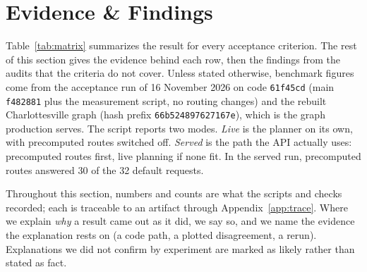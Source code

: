 \section{Evidence \& Findings}
\label{sec:evidence}

Table~\ref{tab:matrix} summarizes the result for every acceptance criterion.
The rest of this section gives the evidence behind each row, then the
findings from the audits that the criteria do not cover. Unless stated
otherwise, benchmark figures come from the acceptance run of
16 November 2026 on code \texttt{61f45cd} (main
\texttt{f482881} plus the measurement script, no routing changes) and the
rebuilt Charlottesville graph (hash prefix \texttt{66b524897627167e}), which
is the graph production serves. The script reports two modes. \emph{Live} is
the planner on its own, with precomputed routes switched off. \emph{Served}
is the path the API actually uses: precomputed routes first, live planning
if none fit. In the served run, precomputed routes answered 30 of the 32
default requests.

Throughout this section, numbers and counts are what the scripts and checks
recorded; each is traceable to an artifact through
Appendix~\ref{app:trace}. Where we explain \emph{why} a result came out as it
did, we say so, and we name the evidence the explanation rests on (a code
path, a plotted disagreement, a rerun). Explanations we did not confirm by
experiment are marked as likely rather than stated as fact.

